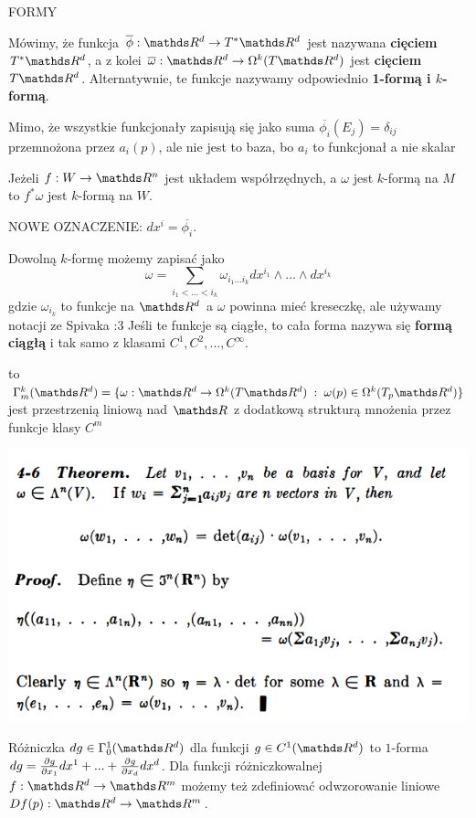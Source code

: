 \documentclass{article}
\begin{document}
{\large\color{def}FORMY}
\begin{description}
    \item Mówimy, że funkcja $\overline{\phi}:\R^d\to T^*\R^d$ jest nazywana \textbf{cięciem} $T^*\R^d$, a z kolei $\overline{\omega}:\R^d\to\Omega^k(T\R^d)$ jest \textbf{cięciem $T\R^d$}. Alternatywnie, te funkcje nazywamy odpowiednio \textbf{\color{acc}1-formą i $k$-formą}.   
    \item Mimo, że wszystkie funkcjonały zapisują się jako suma $\overline{\phi_i}(E_j)=\delta_{ij}$ przemnożona przez $a_i(p)$, ale nie jest to baza, bo $a_i$ to funkcjonał a nie skalar
    \item Jeżeli $f:W\to \R^n$ jest układem współrzędnych, a $\omega$ jest $k$-formą na $M$ to $f^*\omega$ jest $k$-formą na $W$.
    \item {\color{def}NOWE OZNACZENIE: $dx^i=\overline{\phi_i}$.}
    \item Dowolną $k$-formę możemy zapisać jako $$\omega=\sum\limits_{i_1<...<i_k}\omega_{i_1...i_k}dx^{i_1}\land ...\land dx^{i_k}$$ gdzie $\omega_{i_k}$ to funkcje na $\R^d$ a $\omega$ powinna mieć kreseczkę, ale używamy notacji ze Spivaka :3 Jeśli te funkcje są ciągłe, to cała forma nazywa się \textbf{\color{acc}formą ciągłą} i tak samo z klasami $C^1,C^2,...,C^\infty$.
    \item [Przestrzeń $k$-form klasy $C^m$] to $\Gamma^k_m(\R^d)=\{\omega:\R^d\to\Omega^k(T\R^d)\;:\;\omega(p)\in\Omega^k(T_p\R^d)\}$ jest przestrzenią liniową nad $\R$ z dodatkową strukturą mnożenia przez funkcje klasy $C^m$
\end{description}

\includegraphics[width=\textwidth]{4.6.png}

{\color{def}Różniczka $dg\in\Gamma^1_0(\R^d)$} dla funkcji $g\in C^1(\R^d)$ to $1$-forma $dg={\partial g\over \partial x_1}dx^1+...+{\partial g\over \partial x_d}dx^d$. Dla funkcji różniczkowalnej $f:\R^d\to\R^m$ możemy też zdefiniować odwzorowanie liniowe $Df(p):\R^d\to\R^m$.
\end{document}
